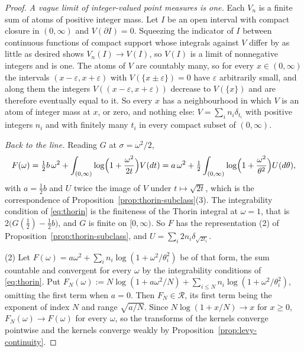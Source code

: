 \begin{proof}
\emph{A vague limit of integer-valued point measures is one.} Each $V_n$ is a finite sum of atoms
of positive integer mass. Let $I$ be an open interval with compact closure in $(0,\infty)$ and
$V(\partial I) = 0$. Squeezing the indicator of $I$ between continuous functions of compact
support whose integrals against $V$ differ by as little as desired shows $V_n(I) \to V(I)$, so
$V(I)$ is a limit of nonnegative integers and is one. The atoms of $V$ are countably many, so
for every $x \in (0,\infty)$ the intervals $(x - \varepsilon, x + \varepsilon)$ with
$V(\{x \pm \varepsilon\}) = 0$ have $\varepsilon$ arbitrarily small, and along them the integers
$V((x-\varepsilon,x+\varepsilon))$ decrease to $V(\{x\})$ and are therefore eventually equal to
it. So every $x$ has a neighbourhood in which $V$ is an atom of integer mass at $x$, or zero,
and nothing else: $V = \sum_i n_i\delta_{t_i}$ with positive integers $n_i$ and with finitely
many $t_i$ in every compact subset of $(0,\infty)$.

\emph{Back to the line.} Reading $G$ at $\sigma = \omega^2/2$,
\[
  F(\omega) = \tfrac12 b\,\omega^2 + \int_{(0,\infty)}\log\Bigl(1 + \frac{\omega^2}{2t}\Bigr)V(dt)
   = a\,\omega^2 + \tfrac12\int_{(0,\infty)}\log\Bigl(1 + \frac{\omega^2}{\theta^2}\Bigr)U(d\theta),
\]
with $a = \tfrac12 b$ and $U$ twice the image of $V$ under $t \mapsto \sqrt{2t}$, which is the
correspondence of Proposition~\ref{prop:thorin-subclass}(3). The integrability condition of
\ref{eq:thorin} is the finiteness of the Thorin integral at $\omega = 1$, that is
$2\bigl(G(\tfrac12) - \tfrac12b\bigr)$, and $G$ is finite on $[0,\infty)$. So $F$ has the representation
(2) of Proposition~\ref{prop:thorin-subclass}, and $U = \sum_i 2n_i\delta_{\sqrt{2t_i}}$.

(2) Let $F(\omega) = a\omega^2 + \sum_i n_i\log(1 + \omega^2/\theta_i^2)$ be of that form, the sum
countable and convergent for every $\omega$ by the integrability conditions of \ref{eq:thorin}.
Put $F_N(\omega) := N\log(1 + a\omega^2/N) + \sum_{i \le N} n_i\log(1 + \omega^2/\theta_i^2)$,
omitting the first term when $a = 0$. Then $F_N \in \mathcal{R}$, its first term being the
\Matern{} exponent of index $N$ and range $\sqrt{a/N}$. Since $N\log(1 + x/N) \to x$ for
$x \ge 0$, $F_N(\omega) \to F(\omega)$ for every $\omega$, so the transforms of the kernels
converge pointwise and the kernels converge weakly by Proposition~\ref{prop:levy-continuity}.


\end{proof}

